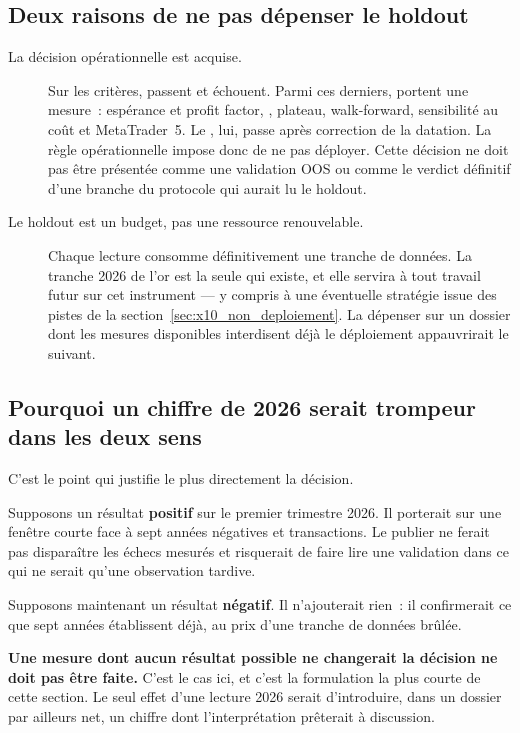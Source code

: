 \subsection{Deux raisons de ne pas dépenser le holdout}

\begin{description}
  \item[La décision opérationnelle est acquise.] Sur les
  \XTenCriteriaCount{} critères, \XTenCriteriaPassing{} passent et
  \XTenCriteriaFailing{} échouent. Parmi ces derniers,
  \XTenCriteriaFailingInterpretable{} portent une mesure~: espérance et profit
  factor, , plateau, walk-forward, sensibilité au coût et
  MetaTrader~5. Le , lui, passe après correction de la datation. La
  règle opérationnelle impose donc de ne pas déployer. Cette décision ne doit
  pas être présentée comme une validation OOS ou comme le verdict définitif
  d'une branche du protocole qui aurait lu le holdout.

  \item[Le holdout est un budget, pas une ressource renouvelable.] Chaque
  lecture consomme définitivement une tranche de données. La tranche 2026 de
  l'or est la seule qui existe, et elle servira à tout travail futur sur cet
  instrument --- y compris à une éventuelle stratégie issue des pistes de la
  section~\ref{sec:x10_non_deploiement}. La dépenser sur un dossier dont les
  mesures disponibles interdisent déjà le déploiement appauvrirait le suivant.
\end{description}

\subsection{Pourquoi un chiffre de 2026 serait trompeur dans les deux sens}

C'est le point qui justifie le plus directement la décision.

Supposons un résultat \textbf{positif} sur le premier trimestre 2026. Il
porterait sur une fenêtre courte face à sept années négatives et
\XTenTradesIS{} transactions. Le publier ne ferait pas disparaître les
\XTenCriteriaFailingInterpretable{} échecs mesurés et risquerait de faire lire
une validation dans ce qui ne serait qu'une observation tardive.

Supposons maintenant un résultat \textbf{négatif}. Il n'ajouterait rien~: il
confirmerait ce que sept années établissent déjà, au prix d'une tranche de
données brûlée.

\begin{warningbox}
\textbf{Une mesure dont aucun résultat possible ne changerait la décision ne
doit pas être faite.} C'est le cas ici, et c'est la formulation la plus courte
de cette section. Le seul effet d'une lecture 2026 serait d'introduire, dans
un dossier par ailleurs net, un chiffre dont l'interprétation prêterait à
discussion.
\end{warningbox}

